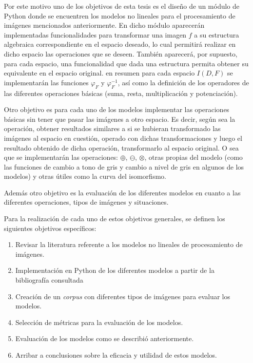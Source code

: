 Por este motivo uno de los objetivos de esta tesis es el dise\~no de un m\'odulo de Python donde se encuentren los modelos no lineales para el procesamiento de im\'agenes mencionados anteriormente. En dicho m\'odulo aparecer\'an implementadas funcionalidades para transformar una imagen $f$ a su estructura algebraica correspondiente en el espacio deseado, lo cual permitir\'a realizar en dicho espacio las operaciones que se deseen. Tambi\'en aparecer\'a, por supuesto, para cada espacio, una funcionalidad que dada una estructura permita obtener su equivalente en el espacio original. en resumen para cada espacio $I(D,F)$ se implementar\'an las funciones $\varphi_F$ y $\varphi^{-1}_F$, as\'i como la definici\'on de los operadores de las diferentes operaciones b\'asicas (suma, resta, multiplicaci\'on y potenciaci\'on).

Otro objetivo es para cada uno de los modelos implementar las operaciones b\'asicas sin tener que pasar las im\'agenes a otro espacio. Es decir, seg\'un sea la operaci\'on, obtener resultados similares a si se hubieran transformado las im\'agenes al espacio en cuesti\'on, operado con dichas transformaciones y luego el resultado obtenido de dicha operaci\'on, transformarlo al espacio original. O sea que se implementar\'an las operaciones: $\oplus$, $\ominus$, $\otimes$, otras propias del modelo (como las funciones de cambio a tono de gris y cambio a nivel de gris en algunos de los modelos) y otras \'utiles como la curva del isomorfismo.

Adem\'as otro objetivo es la evaluaci\'on de los diferentes modelos en cuanto a las diferentes operaciones, tipos de im\'agenes y situaciones.

Para la realizaci\'on de cada uno de estos objetivos generales, se definen los siguientes objetivos espec\'ificos:

\begin{enumerate}
	\item Revisar la literatura referente a los modelos no lineales de procesamiento de im\'agenes.
	\item Implementaci\'on en Python de los diferentes modelos a partir de la bibliograf\'ia consultada
	\item Creaci\'on de un \textit{corpus} con diferentes tipos de im\'agenes para evaluar los modelos.
	\item Selecci\'on de m\'etricas para la evaluaci\'on de los modelos.
	\item Evaluaci\'on de los modelos como se describi\'o anteriormente.
	\item Arribar a conclusiones sobre la eficacia y utilidad de estos modelos. 
\end{enumerate}

